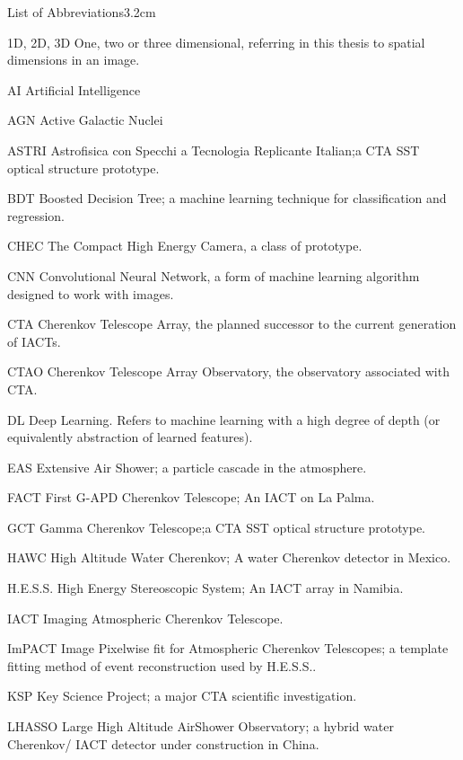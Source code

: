 \begin{mclistof}{List of Abbreviations}{3.2cm}

\item[1D, 2D, 3D] One, two or three dimensional, referring in this thesis to spatial dimensions in an image.
\item[AI] Artificial Intelligence
\item[AGN] Active Galactic Nuclei
\item[ASTRI] Astrofisica con Specchi a Tecnologia Replicante Italian;a CTA SST optical structure prototype.
\item[BDT] Boosted Decision Tree; a machine learning technique for classification and regression.
\item[CHEC] The Compact High Energy Camera, a class of prototype.
\item[CNN] Convolutional Neural Network, a form of machine learning algorithm designed to work with images.
\item[CTA] Cherenkov Telescope Array, the planned successor to the current generation of IACTs.
\item[CTAO] Cherenkov Telescope Array Observatory, the observatory associated with CTA.
\item[DL] Deep Learning. Refers to machine learning with a high degree of depth (or equivalently abstraction of learned features).
\item[EAS] Extensive Air Shower; a particle cascade in the atmosphere.
\item[FACT] First G-APD Cherenkov Telescope; An IACT on La Palma.
\item[GCT] Gamma Cherenkov Telescope;a CTA SST optical structure prototype.
\item[HAWC] High Altitude Water Cherenkov; A water Cherenkov detector in Mexico.
\item[H.E.S.S.] High Energy Stereoscopic System; An IACT array in Namibia.
\item[IACT] Imaging Atmospheric Cherenkov Telescope.
\item[ImPACT] Image Pixelwise fit for Atmospheric Cherenkov Telescopes; a template fitting method of event reconstruction used by H.E.S.S..
\item[KSP] Key Science Project; a major CTA scientific investigation.
\item[LHASSO] Large High Altitude AirShower Observatory; a hybrid water Cherenkov/ IACT detector under construction in China.

\end{mclistof}
